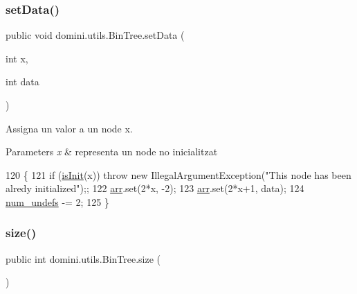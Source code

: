\subsubsection{\texorpdfstring{set\+Data()}{setData()}}
{\footnotesize\ttfamily public void domini.\+utils.\+Bin\+Tree.\+set\+Data (\begin{DoxyParamCaption}\item[{int}]{x,  }\item[{int}]{data }\end{DoxyParamCaption})\hspace{0.3cm}{\ttfamily [inline]}}



Assigna un valor a un node x. 


\begin{DoxyParams}{Parameters}
{\em x} & representa un node no inicialitzat \\
\hline
\end{DoxyParams}

\begin{DoxyCode}
120                                          \{
121         \textcolor{keywordflow}{if} (\hyperlink{classdomini_1_1utils_1_1BinTree_aefcc4df5059f9893eba9998cb267eced}{isInit}(x)) \textcolor{keywordflow}{throw} \textcolor{keyword}{new} IllegalArgumentException(\textcolor{stringliteral}{"This node has been alredy initialized"});;
122         \hyperlink{classdomini_1_1utils_1_1BinTree_a357bcbcf07ba7fcb99d11b237d189e65}{arr}.set(2*x, -2);
123         \hyperlink{classdomini_1_1utils_1_1BinTree_a357bcbcf07ba7fcb99d11b237d189e65}{arr}.set(2*x+1, data);
124         \hyperlink{classdomini_1_1utils_1_1BinTree_a36f1212262c353accbc0a0385fa45a8d}{num\_undefs} -= 2;
125     \}
\end{DoxyCode}
\mbox{\label{classdomini_1_1utils_1_1BinTree_afb98cb560c437784fe3ce1b8d6aa046e}} 
\subsubsection{\texorpdfstring{size()}{size()}}
{\footnotesize\ttfamily public int domini.\+utils.\+Bin\+Tree.\+size (\begin{DoxyParamCaption}{ }\end{DoxyParamCaption})\hspace{0.3cm}{\ttfamily [inline]}}




